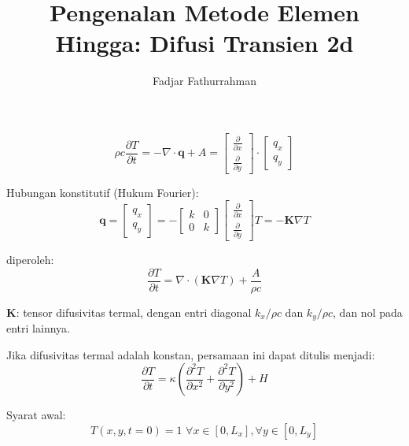 %




\title{Pengenalan Metode Elemen Hingga: Difusi Transien 2d}
\author{Fadjar Fathurrahman}
\date{}
\maketitle

\begin{equation*}
\rho c \frac{\partial T}{\partial t} = -\nabla \cdot \mathbf{q} + A = 
\begin{bmatrix}\frac{\partial}{\partial x} \\
\frac{\partial}{\partial y} \end{bmatrix} \cdot
\begin{bmatrix} q_x \\ q_y \end{bmatrix}
\end{equation*}

Hubungan konstitutif (Hukum Fourier):
\begin{equation*}
\mathbf{q} = \begin{bmatrix}
q_x \\ q_y \end{bmatrix} = 
-\begin{bmatrix} k & 0 \\ 0 & k \end{bmatrix}
\begin{bmatrix} \frac{\partial}{\partial x} \\ \frac{\partial}{\partial y} \end{bmatrix} T =
-\mathbf{K} \nabla T
\end{equation*}

diperoleh:
\begin{equation*}
\frac{\partial T}{\partial t} = \nabla \cdot (\mathbf{K} \nabla T) + \frac{A}{\rho c}
\end{equation*}

$\mathbf{K}$: tensor difusivitas termal, dengan entri diagonal $k_x/\rho c$ dan
$k_y/\rho c$, dan nol pada entri lainnya.

Jika difusivitas termal adalah konstan, persamaan ini dapat ditulis menjadi:
\begin{equation*}
\frac{\partial T}{\partial t} = \kappa \left(
\frac{\partial^2 T}{\partial x^2} + \frac{\partial^2 T}{\partial y^2}
\right) + H
\end{equation*}

Syarat awal:
\begin{equation*}
T(x,y,t=0) = 1 \,\, \forall x \in [0,L_x], \forall y \in [0,L_y]
\end{equation*}

